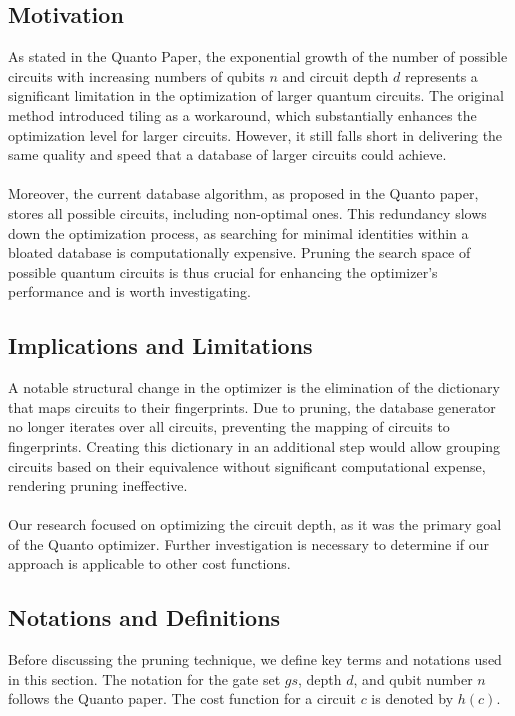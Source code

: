 \subsection{Motivation}
As stated in the Quanto Paper, the exponential growth of the number of possible circuits with increasing numbers of qubits $n$ and circuit depth $d$ represents a significant limitation in the optimization of larger quantum circuits. The original method introduced tiling as a workaround, which substantially enhances the optimization level for larger circuits. However, it still falls short in delivering the same quality and speed that a database of larger circuits could achieve.
\\\\
Moreover, the current database algorithm, as proposed in the Quanto paper, stores all possible circuits, including non-optimal ones. This redundancy slows down the optimization process, as searching for minimal identities within a bloated database is computationally expensive. Pruning the search space of possible quantum circuits is thus crucial for enhancing the optimizer's performance and is worth investigating.

\subsection{Implications and Limitations}
A notable structural change in the optimizer is the elimination of the dictionary that maps circuits to their fingerprints. Due to pruning, the database generator no longer iterates over all circuits, preventing the mapping of circuits to fingerprints. Creating this dictionary in an additional step would allow grouping circuits based on their equivalence without significant computational expense, rendering pruning ineffective.
\\\\
Our research focused on optimizing the circuit depth, as it was the primary goal of the Quanto optimizer. Further investigation is necessary to determine if our approach is applicable to other cost functions.

\subsection{Notations and Definitions}
Before discussing the pruning technique, we define key terms and notations used in this section. The notation for the gate set $gs$, depth $d$, and qubit number $n$ follows the Quanto paper. The cost function for a circuit $c$ is denoted by $h(c)$.

